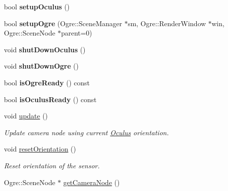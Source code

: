 \begin{DoxyCompactItemize}
\item 
\hypertarget{classOculus_a6640889e484d897735691a03ae1d8384}{bool {\bfseries setup\-Oculus} ()}\label{classOculus_a6640889e484d897735691a03ae1d8384}

\item 
\hypertarget{classOculus_accdc766b373dbc47f116f54ac8c250ac}{bool {\bfseries setup\-Ogre} (\-Ogre\-::\-Scene\-Manager $\ast$sm, \-Ogre\-::\-Render\-Window $\ast$win, \-Ogre\-::\-Scene\-Node $\ast$parent=0)}\label{classOculus_accdc766b373dbc47f116f54ac8c250ac}

\item 
\hypertarget{classOculus_ace286547c90c6542791b262dfa23c121}{void {\bfseries shut\-Down\-Oculus} ()}\label{classOculus_ace286547c90c6542791b262dfa23c121}

\item 
\hypertarget{classOculus_ac81fab6972076af3163e32bc4b1b8cd9}{void {\bfseries shut\-Down\-Ogre} ()}\label{classOculus_ac81fab6972076af3163e32bc4b1b8cd9}

\item 
\hypertarget{classOculus_a12900a96969e29b205c91dc674fa6e3c}{bool {\bfseries is\-Ogre\-Ready} () const }\label{classOculus_a12900a96969e29b205c91dc674fa6e3c}

\item 
\hypertarget{classOculus_a900f90713f56a74b1d19be9f806d9948}{bool {\bfseries is\-Oculus\-Ready} () const }\label{classOculus_a900f90713f56a74b1d19be9f806d9948}

\item 
\hypertarget{classOculus_a8218c82da106443d8fbd05f0bfe326fd}{void \hyperlink{classOculus_a8218c82da106443d8fbd05f0bfe326fd}{update} ()}\label{classOculus_a8218c82da106443d8fbd05f0bfe326fd}

\begin{DoxyCompactList}\small\item\em \-Update camera node using current \hyperlink{classOculus}{\-Oculus} orientation. \end{DoxyCompactList}\item 
\hypertarget{classOculus_ae969c54fc823d9fdfbf53b06810bc364}{void \hyperlink{classOculus_ae969c54fc823d9fdfbf53b06810bc364}{reset\-Orientation} ()}\label{classOculus_ae969c54fc823d9fdfbf53b06810bc364}

\begin{DoxyCompactList}\small\item\em \-Reset orientation of the sensor. \end{DoxyCompactList}\item 
\hypertarget{classOculus_a39ba8ece6a11aa64b7785a7adfa1753f}{\-Ogre\-::\-Scene\-Node $\ast$ \hyperlink{classOculus_a39ba8ece6a11aa64b7785a7adfa1753f}{get\-Camera\-Node} ()}\label{classOculus_a39ba8ece6a11aa64b7785a7adfa1753f}


\end{DoxyCompactItemize}
